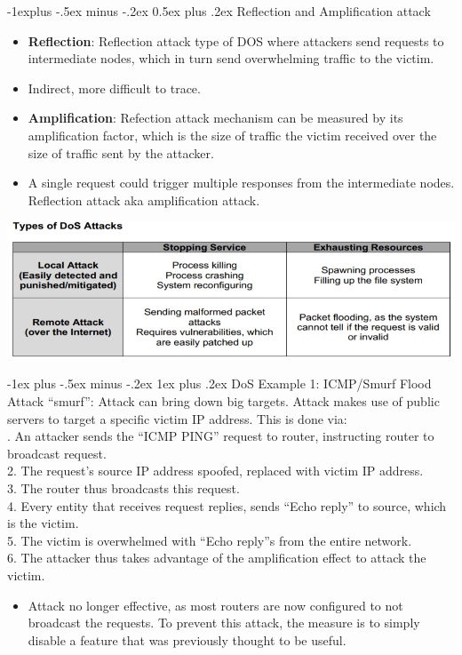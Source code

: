 \documentclass[10pt, landscape]{article}
\makeatletter
\renewcommand{\subsection}{\@startsection{subsection}{2}{0mm}%
                                {-1explus -.5ex minus -.2ex}%
                                {0.5ex plus .2ex}%
                                {\normalfont\normalsize\bfseries}}
\renewcommand{\subsubsection}{\@startsection{subsubsection}{3}{0mm}%
                                {-1ex plus -.5ex minus -.2ex}%
                                {1ex plus .2ex}%
                                {\normalfont\small\bfseries}}
\makeatother
\begin{document}
\begin{multicols*}{3}
\subsection{Reflection and Amplification attack}
\begin{itemize}
\item \textbf{Reflection}: Reflection attack type of DOS where attackers send requests to intermediate nodes, 
which in turn send overwhelming traffic to the victim. 
\item Indirect, more difficult to trace. 
\item \textbf{Amplification}: Refection attack mechanism can be measured by its amplification factor, which is the size of traffic 
the victim received over the size of traffic sent by the attacker.
\item A single request could trigger multiple responses from the intermediate nodes. Reflection attack aka amplification attack.
\end{itemize}
\centerline{\includegraphics[width=1\linewidth]{DoSAttacks}}

\subsubsection{DoS Example 1: ICMP/Smurf Flood Attack}
“smurf”: Attack can bring down big targets. Attack makes use of public servers to target a specific victim IP address. This 
is done via: \\ . An attacker sends the “ICMP PING” request to router, instructing router to broadcast request. \\
2. The request’s source IP address spoofed, replaced with victim IP address. \\
3. The router thus broadcasts this request. \\
4. Every entity that receives request replies, sends “Echo reply” to source, which is the victim. \\
5. The victim is overwhelmed with “Echo reply”s from the entire network. \\
6. The attacker thus takes advantage of the amplification effect to attack the victim.
\begin{itemize}
\item Attack no longer effective, as most routers are now configured to not broadcast the requests. To prevent this attack, the measure is to simply disable a feature that was previously thought to be useful.
\end{itemize}


\end{multicols*}
\end{document}
